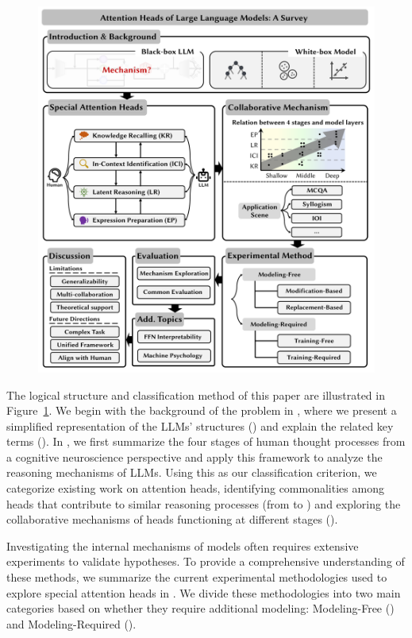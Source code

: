 \documentclass[12pt,letterpaper]{article}
\begin{document}
\begin{figure}[!ht]
    \centering
    \includegraphics[width=\linewidth]{figures/framework.pdf}
    \caption{}
    \label{fig:Overview}
\end{figure}

The logical structure and classification method of this paper are illustrated in Figure~\ref{fig:Overview}. We begin with the background of the problem in , where we present a simplified representation of the LLMs' structures () and explain the related key terms (). In , we first summarize the four stages of human thought processes from a cognitive neuroscience perspective and apply this framework to analyze the reasoning mechanisms of LLMs. Using this as our classification criterion, we categorize existing work on attention heads, identifying commonalities among heads that contribute to similar reasoning processes (from  to ) and exploring the collaborative mechanisms of heads functioning at different stages ().

Investigating the internal mechanisms of models often requires extensive experiments to validate hypotheses. To provide a comprehensive understanding of these methods, we summarize the current experimental methodologies used to explore special attention heads in . We divide these methodologies into two main categories based on whether they require additional modeling: Modeling-Free () and Modeling-Required ().
\end{document}
